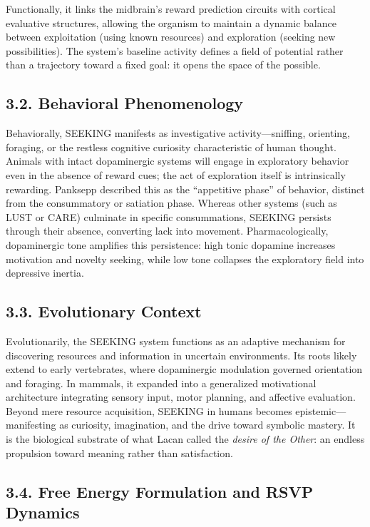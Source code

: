 \documentclass[12pt,a4paper]{article}
\begin{document}
Functionally, it links the midbrain’s reward prediction circuits with cortical evaluative structures, allowing the organism to maintain a dynamic balance between exploitation (using known resources) and exploration (seeking new possibilities).  
The system’s baseline activity defines a field of potential rather than a trajectory toward a fixed goal: it opens the space of the possible.

\subsection{3.2. Behavioral Phenomenology}

Behaviorally, SEEKING manifests as investigative activity—sniffing, orienting, foraging, or the restless cognitive curiosity characteristic of human thought.  
Animals with intact dopaminergic systems will engage in exploratory behavior even in the absence of reward cues; the act of exploration itself is intrinsically rewarding.  
Panksepp described this as the “appetitive phase” of behavior, distinct from the consummatory or satiation phase.  
Whereas other systems (such as \textsc{LUST} or \textsc{CARE}) culminate in specific consummations, \textsc{SEEKING} persists through their absence, converting lack into movement.  
Pharmacologically, dopaminergic tone amplifies this persistence: high tonic dopamine increases motivation and novelty seeking, while low tone collapses the exploratory field into depressive inertia.

\subsection{3.3. Evolutionary Context}

Evolutionarily, the SEEKING system functions as an adaptive mechanism for discovering resources and information in uncertain environments.  
Its roots likely extend to early vertebrates, where dopaminergic modulation governed orientation and foraging.  
In mammals, it expanded into a generalized motivational architecture integrating sensory input, motor planning, and affective evaluation.  
Beyond mere resource acquisition, SEEKING in humans becomes epistemic—manifesting as curiosity, imagination, and the drive toward symbolic mastery.  
It is the biological substrate of what Lacan called the \emph{desire of the Other}: an endless propulsion toward meaning rather than satisfaction.

\subsection{3.4. Free Energy Formulation and RSVP Dynamics}
\end{document}
